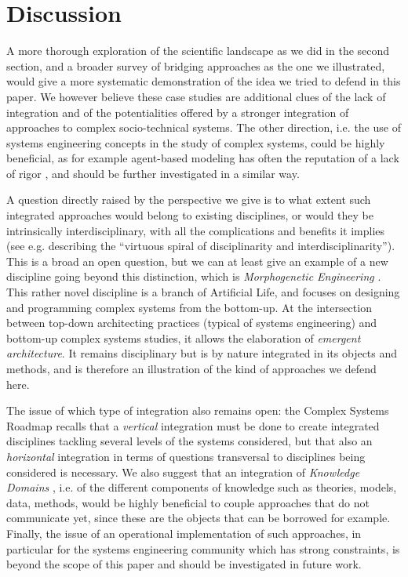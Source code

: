\documentclass[runningheads,a4paper]{llncs2e/llncs}
\begin{document}
\section{Discussion}


A more thorough exploration of the scientific landscape as we did in the second section, and a broader survey of bridging approaches as the one we illustrated, would give a more systematic demonstration of the idea we tried to defend in this paper. We however believe these case studies are additional clues of the lack of integration and of the potentialities offered by a stronger integration of approaches to complex socio-technical systems. The other direction, i.e. the use of systems engineering concepts in the study of complex systems, could be highly beneficial, as for example agent-based modeling has often the reputation of a lack of rigor \cite{rand2011agent}, and should be further investigated in a similar way.

A question directly raised by the perspective we give is to what extent such integrated approaches would belong to existing disciplines, or would they be intrinsically interdisciplinary, with all the complications and benefits it implies (see e.g. \cite{banos2013pour} describing the ``virtuous spiral of disciplinarity and interdisciplinarity''). This is a broad an open question, but we can at least give an example of a new discipline going beyond this distinction, which is \emph{Morphogenetic Engineering} \cite{doursat2012morphogenetic}. This rather novel discipline is a branch of Artificial Life, and focuses on designing and programming complex systems from the bottom-up. At the intersection between top-down architecting practices (typical of systems engineering) and bottom-up complex systems studies, it allows the elaboration of \emph{emergent architecture}. It remains disciplinary but is by nature integrated in its objects and methods, and is therefore an illustration of the kind of approaches we defend here.

The issue of which type of integration also remains open: the Complex Systems Roadmap \cite{2009arXiv0907.2221B} recalls that a \emph{vertical} integration must be done to create integrated disciplines tackling several levels of the systems considered, but that also an \emph{horizontal} integration in terms of questions transversal to disciplines being considered is necessary. We also suggest that an integration of \emph{Knowledge Domains} \cite{raimbault2017applied}, i.e. of the different components of knowledge such as theories, models, data, methods, would be highly beneficial to couple approaches that do not communicate yet, since these are the objects that can be borrowed for example. Finally, the issue of an operational implementation of such approaches, in particular for the systems engineering community which has strong constraints, is beyond the scope of this paper and should be investigated in future work.
\end{document}
